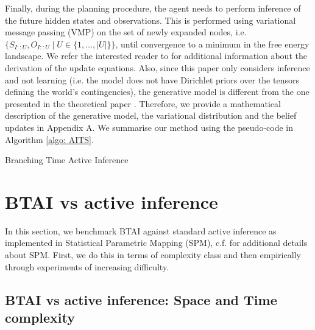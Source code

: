 \documentclass[twoside,11pt]{article}
\begin{document}
Finally, during the planning procedure, the agent needs to perform inference of the future hidden states and observations. This is performed using variational message passing (VMP) on the set of newly expanded nodes, i.e. $\big\{S_{I::U}, O_{I::U} \mid U \in \{1, ..., |U|\}\big\}$, until convergence to a minimum in the free energy landscape. We refer the interested reader to \citep{AI_VMP} for additional information about the derivation of the update equations. Also, since this paper only considers inference and not learning (i.e. the model does not have Dirichlet priors over the tensors defining the world's contingencies), the generative model is different from the one presented in the theoretical paper \citep{AITS_THEORY}. Therefore, we provide a mathematical description of the generative model, the variational distribution and the belief updates in Appendix A. We summarise our method using the pseudo-code in Algorithm \ref{algo: AITS}.

\begin{algorithm}[H]
\label{algo: AITS}
\SetAlgoLined
 \caption{Branching Time Active Inference}
\end{algorithm}

\section{BTAI vs active inference} \label{sec:main_results}

In this section, we benchmark BTAI against standard active inference as implemented in Statistical Parametric Mapping (SPM), c.f. \citet{SPM} for additional details about SPM. First, we do this in terms of complexity class and then empirically through experiments of increasing difficulty.

\subsection{BTAI vs active inference: Space and Time complexity} \label{ssec:complexity_class}
\end{document}
